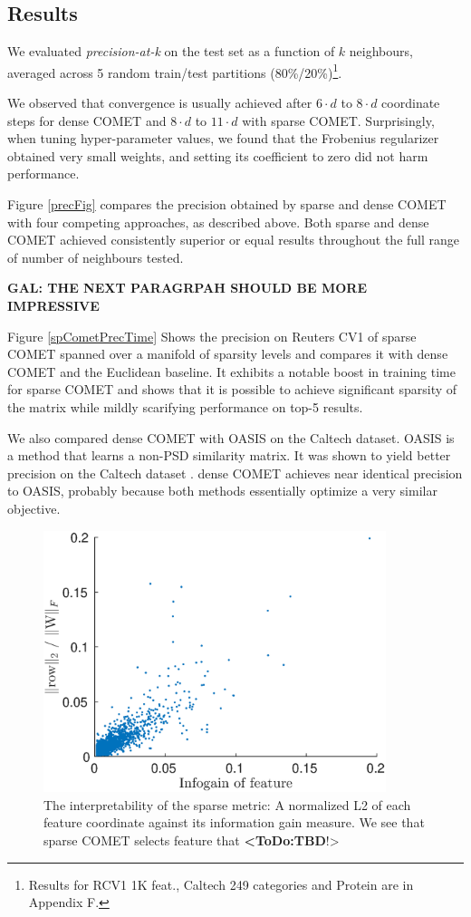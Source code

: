 \documentclass[twoside,11pt]{article}
\newcommand\todo[1]{\textbf{<ToDo:#1}!>}
\newcommand{\ignore}[1]{}
\begin{document}
\subsection{Results}
We evaluated \textit{precision-at-k} on the test set as a function of $k$ neighbours, averaged across 5 random train/test partitions (80\%/20\%)\footnote{Results for RCV1 1K feat., Caltech 249 categories and Protein are in Appendix F.}.
\ignore{Figure \ref{cometConvergeFig} shows the \textit{precision-at-k} over the test sets as it progresses during learning. 
}
We observed that convergence is usually achieved after $6 \cdot d$ to $8 \cdot d$ coordinate steps for dense COMET and $8 \cdot d$ to $11 \cdot d$ with sparse COMET.
Surprisingly, when tuning hyper-parameter values, we found that the Frobenius regularizer obtained very small weights, and setting its coefficient to zero did not harm performance. 

Figure \ref{precFig} compares the precision obtained by sparse and dense COMET with four competing approaches, as described above. Both sparse and dense COMET achieved consistently superior or equal results throughout the full range of number of neighbours tested.

{\bf  GAL: THE NEXT PARAGRPAH SHOULD BE MORE IMPRESSIVE}

Figure \ref{spCometPrecTime} Shows the precision on Reuters CV1 of sparse COMET spanned over a manifold of sparsity levels and compares it with dense COMET and the Euclidean baseline. It exhibits a notable boost in training time for sparse COMET and shows that it is possible to achieve significant sparsity of the matrix while mildly scarifying performance on top-5 results.

We also compared dense COMET with OASIS on the Caltech dataset. OASIS is a method that learns a non-PSD similarity matrix. It was shown to yield better precision on the Caltech dataset \citep{OASIS}. dense COMET achieves near identical precision to OASIS, probably because both methods essentially optimize a very similar objective.

\begin{figure}[ht]
\centering
\includegraphics[width=10cm]{fig3}
\captionsetup{font=small}
\caption{The interpretability of the sparse metric: A normalized L2 of each feature coordinate against its information gain measure. We see that sparse COMET selects feature that \todo{TBD}   }\label{spCometL2vsinfog}
\end{figure}
\end{document}
